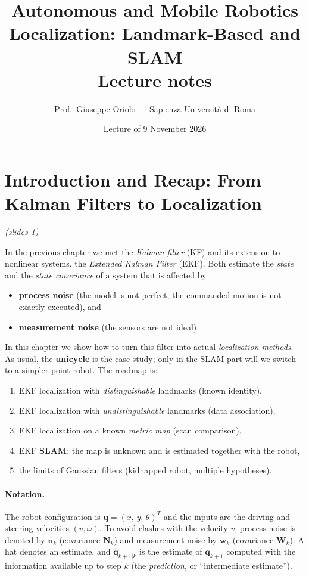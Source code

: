 \documentclass[11pt,a4paper]{article}
\title{\textbf{Autonomous and Mobile Robotics}\\[4pt]
\Large Localization: Landmark-Based and SLAM\\[4pt]
\large Lecture notes}
\author{Prof.\ Giuseppe Oriolo --- Sapienza Universit\`a di Roma}
\date{Lecture of 9 November 2026}
\theoremstyle{definition}
\theoremstyle{plain}
\theoremstyle{remark}
\newcommand{\slides}[1]{\par\vspace{-2pt}\noindent\emph{(slides #1)}\par\smallskip}
\begin{document}
\maketitle
\tableofcontents
\bigskip

\section{Introduction and Recap: From Kalman Filters to Localization}
\slides{1}

In the previous chapter we met the \emph{Kalman filter} (KF) and its extension to nonlinear systems, the \emph{Extended Kalman Filter} (EKF). Both estimate the \emph{state} and the \emph{state covariance} of a system that is affected by
\begin{itemize}
  \item \textbf{process noise} (the model is not perfect, the commanded motion is not exactly executed), and
  \item \textbf{measurement noise} (the sensors are not ideal).
\end{itemize}
In this chapter we show how to turn this filter into actual \emph{localization methods}. As usual, the \textbf{unicycle} is the case study; only in the SLAM part will we switch to a simpler point robot. The roadmap is:
\begin{enumerate}[label=\arabic*.]
  \item EKF localization with \emph{distinguishable} landmarks (known identity),
  \item EKF localization with \emph{undistinguishable} landmarks (data association),
  \item EKF localization on a known \emph{metric map} (scan comparison),
  \item EKF \textbf{SLAM}: the map is unknown and is estimated together with the robot,
  \item the limits of Gaussian filters (kidnapped robot, multiple hypotheses).
\end{enumerate}

\paragraph{Notation.} The robot configuration is $\bm q=(x,\,y,\,\theta)^T$ and the inputs are the driving and steering velocities $(v,\omega)$. To avoid clashes with the velocity $v$, process noise is denoted by $\bm n_k$ (covariance $\bm N_k$) and measurement noise by $\bm w_k$ (covariance $\bm W_k$). A hat denotes an estimate, and $\hat{\bm q}_{k+1|k}$ is the estimate of $\bm q_{k+1}$ computed with the information available up to step $k$ (the \emph{prediction}, or ``intermediate estimate'').
\end{document}
